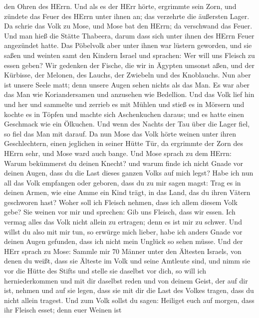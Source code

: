 den Ohren des HErrn. Und als es der HErr hörte, ergrimmte sein Zorn, und
zündete das Feuer des HErrn unter ihnen an; das verzehrte die äußersten
Lager.  Da schrie das Volk zu Mose, und Mose bat den HErrn;
da verschwand das Feuer.  Und man hieß die Stätte Thabeera,
darum dass sich unter ihnen des HErrn Feuer angezündet hatte.
 Das Pöbelvolk aber unter ihnen war lüstern geworden, und
sie saßen und weinten samt den Kindern Israel und sprachen: Wer will uns
Fleisch zu essen geben?  Wir gedenken der Fische, die wir in
Ägypten umsonst aßen, und der Kürbisse, der Melonen, des Lauchs, der
Zwiebeln und des Knoblauchs.  Nun aber ist unsere Seele
matt; denn unsere Augen sehen nichts als das Man.  Es war
aber das Man wie Koriandersamen und anzusehen wie Bedellion.
 Und das Volk lief hin und her und sammelte und zerrieb es
mit Mühlen und stieß es in Mörsern und kochte es in Töpfen und machte
sich Aschenkuchen daraus; und es hatte einen Geschmack wie ein Ölkuchen.
 Und wenn des Nachts der Tau über die Lager fiel, so fiel
das Man mit darauf.  Da nun Mose das Volk hörte weinen
unter ihren Geschlechtern, einen jeglichen in seiner Hütte Tür, da
ergrimmte der Zorn des HErrn sehr, und Mose ward auch bange.
 Und Mose sprach zu dem HErrn: Warum bekümmerst du deinen
Knecht? und warum finde ich nicht Gnade vor deinen Augen, dass du die
Last dieses ganzen Volks auf mich legst?  Habe ich nun all
das Volk empfangen oder geboren, dass du zu mir sagen magst: Trag es in
deinen Armen, wie eine Amme ein Kind trägt, in das Land, das du ihren
Vätern geschworen hast?  Woher soll ich Fleisch nehmen,
dass ich allem diesem Volk gebe? Sie weinen vor mir und sprechen: Gib
uns Fleisch, dass wir essen.  Ich vermag alles das Volk
nicht allein zu ertragen; denn es ist mir zu schwer.  Und
willst du also mit mir tun, so erwürge mich lieber, habe ich anders
Gnade vor deinen Augen gefunden, dass ich nicht mein Unglück so sehen
müsse.  Und der HErr sprach zu Mose: Sammle mir 70 Männer
unter den Ältesten Israels, von denen du weißt, dass sie Älteste im Volk
und seine Amtleute sind, und nimm sie vor die Hütte des Stifts und
stelle sie daselbst vor dich,  so will ich herniederkommen
und mit dir daselbst reden und von deinem Geist, der auf dir ist, nehmen
und auf sie legen, dass sie mit dir die Last des Volkes tragen, dass du
nicht allein tragest.  Und zum Volk sollst du sagen:
Heiliget euch auf morgen, dass ihr Fleisch esset; denn euer Weinen ist
